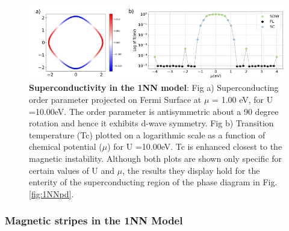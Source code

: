 \documentclass[12pt]{article}
\begin{document}
\begin{figure}[htbp]  %
    \centering
    \includegraphics[width=1.0\textwidth]{1NNSC.png}  %
    \caption{\textbf{Superconductivity in the 1NN model}:  
    Fig a) Superconducting order parameter projected on Fermi Surface at $\mu$ = 1.00 eV, 
    for U =10.00eV. The order parameter is antisymmetric about a 90 degree rotation and hence
    it exhibits d-wave symmetry. 
    Fig b) Transition temperature (Tc) plotted on a logarithmic scale as a function of chemical potential ($\mu$) for U =10.00eV.
    Tc is enhanced closest to the magnetic instability. 
    Although both plots are shown only specific for certain values of U and $\mu$, the results they display hold for the enterity of
    the superconducting region of the phase diagram in Fig.\ref{fig:1NNpd}.  
    }
    \label{fig:1NNSC}
\end{figure}



\subsubsection{Magnetic stripes in the 1NN Model}
\label{subsec:Stripes1NN}
\end{document}
